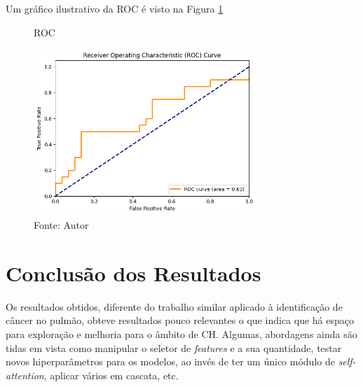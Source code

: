Um gráfico ilustrativo da \gls{ROC} é visto na Figura \ref{fig:fig017}

\begin{figure}[htbp]
    \caption{ROC}
    \centering
    \includegraphics[width=0.75\textwidth]{figures/fig017.png}
    \caption{Fonte: Autor}
    \label{fig:fig017}
\end{figure}

\section{Conclusão dos Resultados} 
\label{sec:cap6_conclusãp_resultados}

Os resultados obtidos, diferente do trabalho similar aplicado à identificação de câncer no pulmão, obteve resultados pouco relevantes o que indica que há espaço para exploração e melhoria para o âmbito de \gls{CH}. Algumas, abordagens ainda são tidas em vista como manipular o seletor de \textit{features} e a sua quantidade, testar novos hiperparâmetros para os modelos, ao invés de ter um único módulo de \textit{self-attention}, aplicar vários em cascata, etc.





